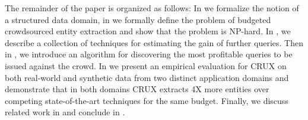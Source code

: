The remainder of the paper is organized as follows: In  we formalize the notion of a structured data domain, in  we formally define the problem of budgeted crowdsourced entity extraction and show that the problem is NP-hard. In , we describe a collection of techniques for estimating the gain of further queries. Then in , we introduce an algorithm for discovering the most profitable queries to be issued against the crowd. In  we present an empirical evaluation for CRUX on both real-world and synthetic data from two distinct application domains and demonstrate that in both domains CRUX extracts 4X more entities over competing state-of-the-art techniques for the same budget. Finally, we discuss related work in  and conclude in .
%
%
